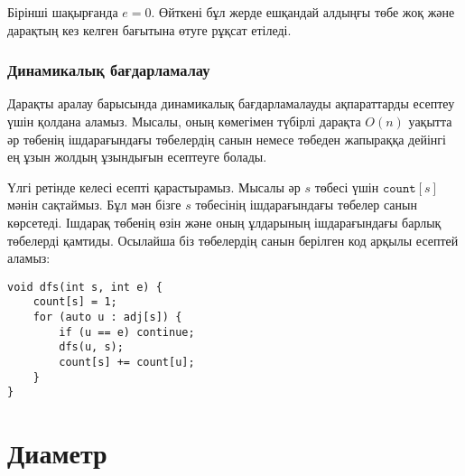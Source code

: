 Бірінші шақырғанда $e=0$. Өйткені бұл
жерде ешқандай алдыңғы төбе жоқ және дарақтың
кез келген бағытына өтуге рұқсат етіледі.

\subsubsection{Динамикалық бағдарламалау}

Дарақты аралау барысында динамикалық бағдарламалауды ақпараттарды есептеу
үшін қолдана аламыз. Мысалы, оның көмегімен
түбірлі дарақта $O(n)$ уақытта әр 
төбенің ішдарағындағы төбелердің
санын немесе төбеден жапыраққа дейінгі ең 
ұзын жолдың ұзындығын есептеуге болады.

Үлгі ретінде келесі есепті қарастырамыз. Мысалы әр $s$ төбесі үшін $\texttt{count}[s]$
мәнін сақтаймыз. Бұл мән бізге $s$ төбесінің ішдарағындағы төбелер санын көрсетеді. Ішдарақ
төбенің өзін және оның ұлдарының ішдарағындағы барлық төбелерді қамтиды. Осылайша біз төбелердің санын
берілген код арқылы есептей аламыз:

\begin{lstlisting}
void dfs(int s, int e) {
    count[s] = 1;
    for (auto u : adj[s]) {
        if (u == e) continue;
        dfs(u, s);
        count[s] += count[u];
    }
}
\end{lstlisting}

\section{Диаметр}


